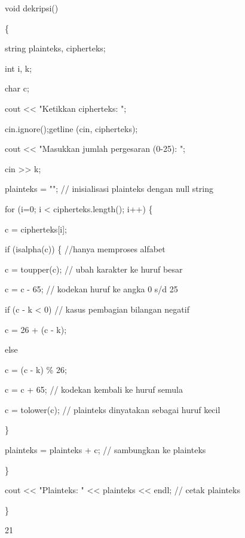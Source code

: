 \documentclass{article}
\begin{document}

void dekripsi()

\{

  string plainteks, cipherteks;

  int i, k;

  char c;

  cout << "Ketikkan cipherteks: ";

  cin.ignore();getline (cin, cipherteks);

  cout << "Masukkan jumlah pergesaran (0-25): ";

  cin >> k;

  plainteks = "";  // inisialisasi plainteks dengan null string 

  for (i=0; i < cipherteks.length(); i++) \{

      c = cipherteks[i];

      if (isalpha(c)) \{    //hanya memproses alfabet

         c = toupper(c);   // ubah karakter ke huruf besar 

         c = c - 65;       // kodekan huruf ke angka 0 s/d 25 

         if (c - k < 0)    // kasus pembagian bilangan negatif

            c = 26 + (c - k);

         else

            c = (c - k) \% 26;       

         c = c + 65;       // kodekan kembali ke huruf semula  

         c = tolower(c); // plainteks dinyatakan sebagai huruf kecil        

      \}      

      plainteks = plainteks + c;  // sambungkan ke plainteks 

  \}

  cout << "Plainteks: " << plainteks << endl;  // cetak plainteks

\}

21
\end{document}
